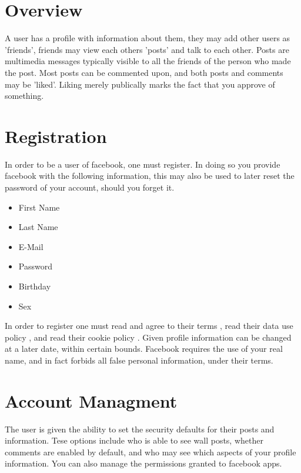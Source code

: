 \section{Overview}
A user has a profile with information about them, they may add other users as
'friends', friends may view each others 'posts' and talk to each other. Posts
are multimedia messages typically visible to all the friends of the person who
made the post. Most posts can be commented upon, and both posts and comments may
be 'liked'. Liking merely publically marks the fact that you approve of
something.

\section{Registration}
In order to be a user of facebook, one must register. In doing so you provide
facebook with the following information, this may also be used to later reset
the password of your account, should you forget it.

\begin{itemize}
\item First Name
\item Last Name
\item E-Mail
\item Password
\item Birthday
\item Sex
\end{itemize}

In order to register one must read and agree to their terms \cite{fbterms}, read
their data use policy \cite{fbdatause}, and read their cookie policy
\cite{fbcookies}.
Given profile information can be changed at a later date, within certain bounds.
Facebook requires the use of your real name, and in fact forbids all false
personal information, under their terms.\cite[4.1]{fbterms}

\section{Account Managment}
The user is given the ability to set the security defaults for their posts and
information. Tese options include who is able to see wall posts, whether
comments are enabled by default, and who may see which aspects of your profile
information. You can also manage the permissions granted to facebook apps.

